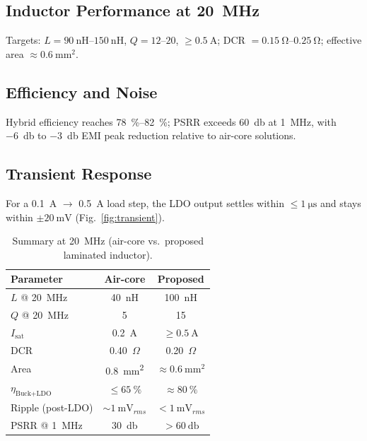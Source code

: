 \documentclass[journal]{IEEEtran}
\begin{document}
\subsection{Inductor Performance at \SI{20}{\mega\hertz}}
Targets: $L=\SIrange{90}{150}{\nano\henry}$, $Q=\numrange{12}{20}$, $\ge\SI{0.5}{\ampere}$; DCR $=\SIrange{0.15}{0.25}{\ohm}$; effective area $\approx\SI{0.6}{\milli\meter\squared}$.

\subsection{Efficiency and Noise}
Hybrid efficiency reaches \SIrange{78}{82}{\percent}; PSRR exceeds \SI{60}{\decibel} at \SI{1}{\mega\hertz}, with \SI{-6}{\decibel} to \SI{-3}{\decibel} EMI peak reduction relative to air-core solutions.

\subsection{Transient Response}
For a \SI{0.1}{\ampere} $\rightarrow$ \SI{0.5}{\ampere} load step, the LDO output settles within $\le\SI{1}{\micro\second}$ and stays within $\pm\SI{20}{\milli\volt}$ (Fig.~\ref{fig:transient}).

\begin{table}[t]
\caption{Summary at \SI{20}{\mega\hertz} (air-core vs.\ proposed laminated inductor).}
\label{tab:summary}
\centering
\begin{tabular}{lcc}
\toprule
Parameter & Air-core & Proposed \\
\midrule
$L$ @ \SI{20}{\mega\hertz} & \SI{40}{\nano\henry} & \SI{100}{\nano\henry} \\
$Q$ @ \SI{20}{\mega\hertz} & 5 & 15 \\
$I_{\text{sat}}$ & \SI{0.2}{\ampere} & $\ge\SI{0.5}{\ampere}$ \\
DCR & 0.40~\(\Omega\) & 0.20~\(\Omega\) \\
Area & \SI{0.8}{\milli\meter\squared} & $\approx\SI{0.6}{\milli\meter\squared}$ \\
$\eta_{\text{Buck+LDO}}$ & $\le\SI{65}{\percent}$ & $\approx\SI{80}{\percent}$ \\
Ripple (post-LDO) & $\sim\SI{1}{\milli\volt_{rms}}$ & $<\SI{1}{\milli\volt_{rms}}$ \\
PSRR @ \SI{1}{\mega\hertz} & \SI{30}{\decibel} & $>\SI{60}{\decibel}$ \\
\bottomrule
\end{tabular}
\end{table}
\end{document}
